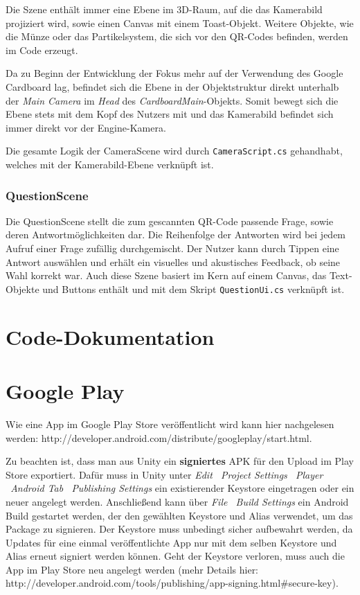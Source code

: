 Die Szene enthält immer eine Ebene im 3D-Raum, auf die das Kamerabild projiziert wird, sowie einen Canvas mit einem Toast-Objekt. Weitere Objekte, wie die Münze oder das Partikelsystem, die sich vor den QR-Codes befinden, werden im Code erzeugt.

Da zu Beginn der Entwicklung der Fokus mehr auf der Verwendung des Google Cardboard lag, befindet sich die Ebene in der Objektstruktur direkt unterhalb der \emph{Main Camera} im \emph{Head} des \emph{CardboardMain}-Objekts. Somit bewegt sich die Ebene stets mit dem Kopf des Nutzers mit und das Kamerabild befindet sich immer direkt vor der Engine-Kamera.

Die gesamte Logik der CameraScene wird durch \texttt{CameraScript.cs} gehandhabt, welches mit der Kamerabild-Ebene verknüpft ist.

\subsubsection{QuestionScene}
\label{subs:QuestionScene}
Die QuestionScene stellt die zum gescannten QR-Code passende Frage, sowie deren Antwortmöglichkeiten dar. Die Reihenfolge der Antworten wird bei jedem Aufruf einer Frage zufällig durchgemischt. Der Nutzer kann durch Tippen eine Antwort auswählen und erhält ein visuelles und akustisches Feedback, ob seine Wahl korrekt war. Auch diese Szene basiert im Kern auf einem Canvas, das Text-Objekte und Buttons enthält und mit dem Skript \texttt{QuestionUi.cs} verknüpft ist.

\section{Code-Dokumentation}

\section{Google Play}
Wie eine App im Google Play Store veröffentlicht wird kann hier nachgelesen werden: http://developer.android.com/distribute/googleplay/start.html.

Zu beachten ist, dass man aus Unity ein \textbf{signiertes} APK für den Upload im Play Store exportiert. Dafür muss in Unity unter \emph{Edit \textrightarrow\ Project Settings \textrightarrow\ Player \textrightarrow\ Android Tab \textrightarrow\ Publishing Settings} ein existierender Keystore eingetragen oder ein neuer angelegt werden. Anschließend kann über \emph{File \textrightarrow\ Build Settings} ein Android Build gestartet werden, der den gewählten Keystore und Alias verwendet, um das Package zu signieren. Der Keystore muss unbedingt sicher aufbewahrt werden, da Updates für eine einmal veröffentlichte App nur mit dem selben Keystore und Alias erneut signiert werden können. Geht der Keystore verloren, muss auch die App im Play Store neu angelegt werden (mehr Details hier: http://developer.android.com/tools/publishing/app-signing.html\#secure-key).
